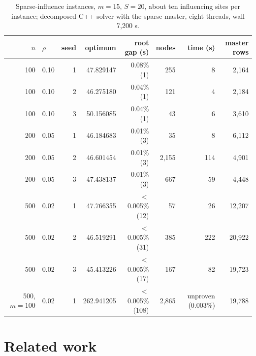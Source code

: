 \documentclass[11pt]{article}
\begin{document}
\begin{table}[ht]
\centering\footnotesize
\caption{Sparse-influence instances, $m = 15$, $S = 20$, about ten influencing sites per instance; decomposed C++
solver with the sparse master, eight threads, wall 7,200 s.}
\label{tab:sparse}
\begin{tabular}{rlr rrrrr}
\toprule
$n$ & $\rho$ & seed & optimum & root gap (s) & nodes & time (s) & master rows\\
\midrule
100 & 0.10 & 1 & 47.829147 & 0.08\% (1) & 255 & 8 & 2,164\\
100 & 0.10 & 2 & 46.275180 & 0.04\% (1) & 121 & 4 & 2,184\\
100 & 0.10 & 3 & 50.156085 & 0.04\% (1) & 43 & 6 & 3,610\\
200 & 0.05 & 1 & 46.184683 & 0.01\% (3) & 35 & 8 & 6,112\\
200 & 0.05 & 2 & 46.601454 & 0.01\% (3) & 2,155 & 114 & 4,901\\
200 & 0.05 & 3 & 47.438137 & 0.01\% (3) & 667 & 59 & 4,448\\
500 & 0.02 & 1 & 47.766355 & $<$0.005\% (12) & 57 & 26 & 12,207\\
500 & 0.02 & 2 & 46.519291 & $<$0.005\% (31) & 385 & 222 & 20,922\\
500 & 0.02 & 3 & 45.413226 & $<$0.005\% (17) & 167 & 82 & 19,723\\
500, $m{=}100$ & 0.02 & 1 & 262.941205 & $<$0.005\% (108) & 2,865 & unproven (0.003\%) & 19,788\\
\bottomrule
\end{tabular}
\end{table}

\section{Related work}\label{sec:related}
\end{document}
